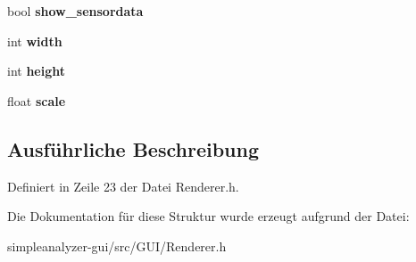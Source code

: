 \begin{DoxyCompactItemize}
\item 
\hypertarget{structViewport__info_a8b44979d9834ef9c3e9086eaa6de1c6d}{bool {\bfseries show\-\_\-sensordata}}\label{structViewport__info_a8b44979d9834ef9c3e9086eaa6de1c6d}

\item 
\hypertarget{structViewport__info_ab8928b607a52ac0c1a5e95c8de7e8cf9}{int {\bfseries width}}\label{structViewport__info_ab8928b607a52ac0c1a5e95c8de7e8cf9}

\item 
\hypertarget{structViewport__info_a465b07df7f804b632968bc112b95aed9}{int {\bfseries height}}\label{structViewport__info_a465b07df7f804b632968bc112b95aed9}

\item 
\hypertarget{structViewport__info_a3e9e50b90a4f11a15ac02c8e53aecc88}{float {\bfseries scale}}\label{structViewport__info_a3e9e50b90a4f11a15ac02c8e53aecc88}

\end{DoxyCompactItemize}


\subsection{Ausführliche Beschreibung}


Definiert in Zeile 23 der Datei Renderer.\-h.



Die Dokumentation für diese Struktur wurde erzeugt aufgrund der Datei\-:\begin{DoxyCompactItemize}
\item 
simpleanalyzer-\/gui/src/\-G\-U\-I/Renderer.\-h\end{DoxyCompactItemize}
